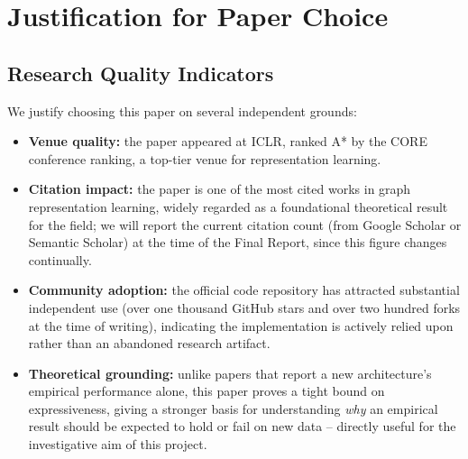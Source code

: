 \documentclass[11pt]{article}
\begin{document}
\section{Justification for Paper Choice}
\label{sec:justification}

\subsection{Research Quality Indicators}
We justify choosing this paper on several independent grounds:
\begin{itemize}
    \item \textbf{Venue quality:} the paper appeared at ICLR, ranked A* by the CORE conference ranking, a top-tier venue for representation learning.
    \item \textbf{Citation impact:} the paper is one of the most cited works in graph representation learning, widely regarded as a foundational theoretical result for the field; we will report the current citation count (from Google Scholar or Semantic Scholar) at the time of the Final Report, since this figure changes continually.
    \item \textbf{Community adoption:} the official code repository has attracted substantial independent use (over one thousand GitHub stars and over two hundred forks at the time of writing), indicating the implementation is actively relied upon rather than an abandoned research artifact.
    \item \textbf{Theoretical grounding:} unlike papers that report a new architecture's empirical performance alone, this paper proves a tight bound on expressiveness, giving a stronger basis for understanding \emph{why} an empirical result should be expected to hold or fail on new data -- directly useful for the investigative aim of this project.
\end{itemize}
\end{document}
